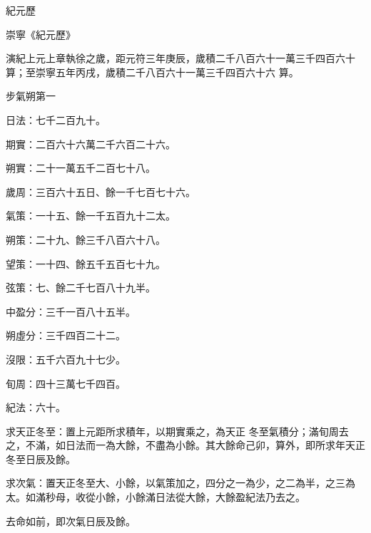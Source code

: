 
\begin{pinyinscope}

 紀元歷



 崇寧《紀元歷》



 演紀上元上章執徐之歲，距元符三年庚辰，歲積二千八百六十一萬三千四百六十算；至崇寧五年丙戌，歲積二千八百六十一萬三千四百六十六
 算。



 步氣朔第一



 日法：七千二百九十。



 期實：二百六十六萬二千六百二十六。



 朔實：二十一萬五千二百七十八。



 歲周：三百六十五日、餘一千七百七十六。



 氣策：一十五、餘一千五百九十二太。



 朔策：二十九、餘三千八百六十八。



 望策：一十四、餘五千五百七十九。



 弦策：七、餘二千七百八十九半。



 中盈分：三千一百八十五半。



 朔虛分：三千四百二十二。



 沒限：五千六百九十七少。



 旬周：四十三萬七千四百。



 紀法：六十。



 求天正冬至：置上元距所求積年，以期實乘之，為天正
 冬至氣積分；滿旬周去之，不滿，如日法而一為大餘，不盡為小餘。其大餘命己卯，算外，即所求年天正冬至日辰及餘。



 求次氣：置天正冬至大、小餘，以氣策加之，四分之一為少，之二為半，之三為太。如滿秒母，收從小餘，小餘滿日法從大餘，大餘盈紀法乃去之。



 去命如前，即次氣日辰及餘。




\end{pinyinscope}
